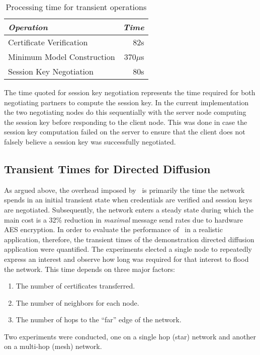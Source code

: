 \begin{table}[tbhp]
  \newcommand\T{\rule{0pt}{2.1ex}}
  \centering
  \caption{Processing time for transient operations}
  {
  \begin{tabular}{|l|r|} \hline
    \textit{Operation} \T & \textit{Time} \\ \hline \hline

    Certificate Verification     \T &  82s \\ \hline 
    Minimum Model Construction   \T & 370$\mu$s \\ \hline
    Session Key Negotiation      \T &  80s\\ \hline
  \end{tabular}
  }
  \label{table-transient-time}
\end{table}

The time quoted for session key negotiation represents the time required for both negotiating
partners to compute the session key. In the current implementation the two negotiating nodes do
this sequentially with the server node computing the session key before responding to the client
node. This was done in case the session key computation failed on the server to ensure that the
client does not falsely believe a session key was successfully negotiated.

\subsection{Transient Times for Directed Diffusion}

As argued above, the overhead imposed by \Sprocket\ is primarily the time the network spends in
an initial transient state when credentials are verified and session keys are negotiated.
Subsequently, the network enters a steady state during which the main cost is a 32\% reduction
in \emph{maximal} message send rates due to hardware AES encryption. In order to evaluate the
performance of \Sprocket\ in a realistic application, therefore, the transient times of the
demonstration directed diffusion application were quantified. The experiments elected a single
node to repeatedly express an interest and observe how long was required for that interest to
flood the network. This time depends on three major factors:
\begin{enumerate}
\item The number of certificates transferred.
\item The number of neighbors for each node.
\item The number of hops to the ``far'' edge of the network.
\end{enumerate}
Two experiments were conducted, one on a single hop (star) network and another on a multi-hop
(mesh) network.

